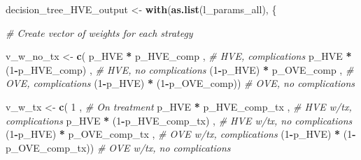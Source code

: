 \documentclass[]{article}
\newenvironment{Shaded}{\begin{snugshade}}{\end{snugshade}}
\newcommand{\KeywordTok}[1]{\textcolor[rgb]{0.13,0.29,0.53}{\textbf{#1}}}
\newcommand{\DecValTok}[1]{\textcolor[rgb]{0.00,0.00,0.81}{#1}}
\newcommand{\StringTok}[1]{\textcolor[rgb]{0.31,0.60,0.02}{#1}}
\newcommand{\CommentTok}[1]{\textcolor[rgb]{0.56,0.35,0.01}{\textit{#1}}}
\newcommand{\OperatorTok}[1]{\textcolor[rgb]{0.81,0.36,0.00}{\textbf{#1}}}
\newcommand{\NormalTok}[1]{#1}
\begin{document}
\begin{Shaded}
\begin{Highlighting}[]
\NormalTok{decision_tree_HVE_output <-}\StringTok{ }\KeywordTok{with}\NormalTok{(}\KeywordTok{as.list}\NormalTok{(l_params_all), \{}
  
  \CommentTok{# Create vector of weights for each strategy }
  
\NormalTok{  v_w_no_tx  <-}\StringTok{ }\KeywordTok{c}\NormalTok{(  p_HVE  }\OperatorTok{*}\StringTok{    }\NormalTok{p_HVE_comp  ,  }\CommentTok{# HVE, complications}
\NormalTok{                    p_HVE  }\OperatorTok{*}\StringTok{ }\NormalTok{(}\DecValTok{1}\OperatorTok{-}\NormalTok{p_HVE_comp) ,  }\CommentTok{# HVE, no complications}
\NormalTok{                 (}\DecValTok{1}\OperatorTok{-}\NormalTok{p_HVE) }\OperatorTok{*}\StringTok{    }\NormalTok{p_OVE_comp  ,  }\CommentTok{# OVE, complications}
\NormalTok{                 (}\DecValTok{1}\OperatorTok{-}\NormalTok{p_HVE) }\OperatorTok{*}\StringTok{ }\NormalTok{(}\DecValTok{1}\OperatorTok{-}\NormalTok{p_OVE_comp))   }\CommentTok{# OVE, no complications}
  
\NormalTok{  v_w_tx     <-}\StringTok{ }\KeywordTok{c}\NormalTok{(  }\DecValTok{1}\NormalTok{                          ,  }\CommentTok{# On treatment}
\NormalTok{                    p_HVE  }\OperatorTok{*}\StringTok{    }\NormalTok{p_HVE_comp_tx  ,  }\CommentTok{# HVE w/tx, complications}
\NormalTok{                    p_HVE  }\OperatorTok{*}\StringTok{ }\NormalTok{(}\DecValTok{1}\OperatorTok{-}\NormalTok{p_HVE_comp_tx) ,  }\CommentTok{# HVE w/tx, no complications}
\NormalTok{                 (}\DecValTok{1}\OperatorTok{-}\NormalTok{p_HVE) }\OperatorTok{*}\StringTok{    }\NormalTok{p_OVE_comp_tx  ,  }\CommentTok{# OVE w/tx, complications}
\NormalTok{                 (}\DecValTok{1}\OperatorTok{-}\NormalTok{p_HVE) }\OperatorTok{*}\StringTok{ }\NormalTok{(}\DecValTok{1}\OperatorTok{-}\NormalTok{p_OVE_comp_tx))   }\CommentTok{# OVE w/tx, no complications}
  

\end{Highlighting}
\end{Shaded}
\end{document}
